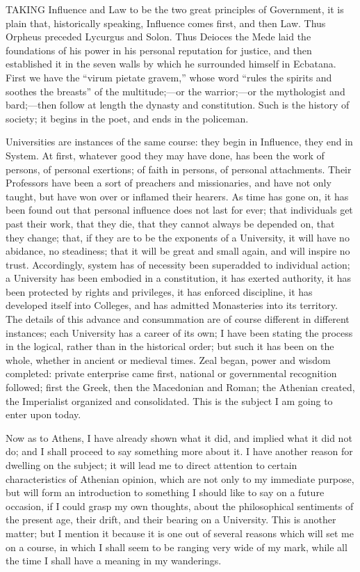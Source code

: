 
TAKING Influence and Law to be the two
great principles of Government, it is plain that, historically
speaking, Influence comes first, and then Law. Thus Orpheus preceded
Lycurgus and Solon. Thus Deioces the Mede laid the foundations of his
power in his personal reputation for justice, and then established it
in the seven walls by which he surrounded himself in Ecbatana. First
we have the ``virum pietate gravem,'' whose word ``rules
the spirits and soothes the breasts'' of the multitude;—or the
warrior;—or the mythologist and bard;—then follow at length the
dynasty and constitution. Such is the history of society; it begins in
the poet, and ends in the policeman.

Universities are instances of the same course: they begin in
Influence, they end in System. At first, whatever good they may have
done, has been the work of persons, of personal exertions; of faith in
persons, of personal attachments. Their Professors have been a sort of
preachers and missionaries, and have not only taught, but have won
over or inflamed their hearers. As time has gone on, it has been found
out that personal influence does not last for ever; that individuals
get past their work, that they die, that they cannot always be
depended on, that they change; that, if they are to be the
exponents of a University, it will have no abidance, no steadiness;
that it will be great and small again, and will inspire no trust.
Accordingly, system has of necessity been superadded to individual
action; a University has been embodied in a constitution, it has
exerted authority, it has been protected by rights and privileges, it
has enforced discipline, it has developed itself into Colleges, and
has admitted Monasteries into its territory. The details of this
advance and consummation are of course different in different
instances; each University has a career of its own; I have been
stating the process in the logical, rather than in the historical
order; but such it has been on the whole, whether in ancient or
medieval times. Zeal began, power and wisdom completed: private
enterprise came first, national or governmental recognition followed;
first the Greek, then the Macedonian and Roman; the Athenian created,
the Imperialist organized and consolidated. This is the subject I am
going to enter upon today.

Now as to Athens, I have already shown what it did, and implied
what it did not do; and I shall proceed to say something more about
it. I have another reason for dwelling on the subject; it will lead me
to direct attention to certain characteristics of Athenian opinion,
which are not only to my immediate purpose, but will form an
introduction to something I should like to say on a future occasion,
if I could grasp my own thoughts, about the philosophical sentiments
of the present age, their drift, and their bearing on a University.
This is another matter; but I mention it because it is one out of
several reasons which will set me on a course, in which I shall seem
to be ranging very wide of my mark, while all the time I shall have a
meaning in my wanderings.

